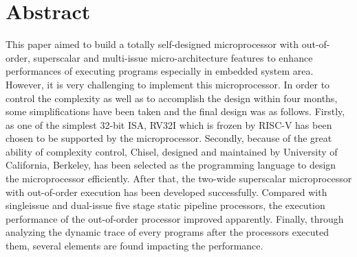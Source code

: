 \chapter*{Abstract}%

This paper aimed to build a totally self-designed microprocessor with out-of-order, superscalar and multi-issue micro-architecture features to enhance performances of executing programs especially in embedded system area. However, it is very challenging to implement this microprocessor. In order to control the complexity as well as to accomplish the design within four months, some simplifications have been taken and the final design was as follows. Firstly, as one of the simplest 32-bit ISA, RV32I which is frozen by RISC-V has been chosen to be supported by the microprocessor. Secondly, because of the great ability of complexity control, Chisel, designed and maintained by University of California, Berkeley, has been selected as the programming language to design the microprocessor efficiently. After that, the two-wide superscalar microprocessor with out-of-order execution has been developed successfully. Compared with singleissue and dual-issue five stage static pipeline processors, the execution performance of the out-of-order processor improved apparently. Finally, through analyzing the dynamic trace of every programs after the processors executed them, several elements are found impacting the performance.

